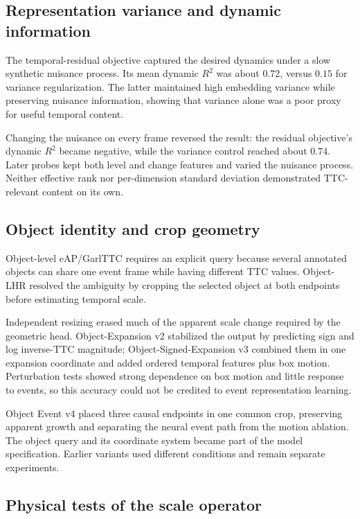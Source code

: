 \subsection{Representation variance and dynamic information}

The temporal-residual objective captured the desired dynamics under a slow synthetic nuisance process. Its mean dynamic $R^2$ was about $0.72$, versus $0.15$ for variance regularization. The latter maintained high embedding variance while preserving nuisance information, showing that variance alone was a poor proxy for useful temporal content. 

Changing the nuisance on every frame reversed the result: the residual objective's dynamic $R^2$ became negative, while the variance control reached about $0.74$. Later probes kept both level and change features and varied the nuisance process. Neither effective rank nor per-dimension standard deviation demonstrated TTC-relevant content on its own. 

\subsection{Object identity and crop geometry}

Object-level eAP/GarlTTC requires an explicit query because several annotated objects can share one event frame while having different TTC values. Object-LHR resolved the ambiguity by cropping the selected object at both endpoints before estimating temporal scale.

Independent resizing erased much of the apparent scale change required by the geometric head. Object-Expansion v2 stabilized the output by predicting sign and log inverse-TTC magnitude; Object-Signed-Expansion v3 combined them in one expansion coordinate and added ordered temporal features plus box motion. Perturbation tests showed strong dependence on box motion and little response to events, so this accuracy could not be credited to event representation learning.

Object Event v4 placed three causal endpoints in one common crop, preserving apparent growth and separating the neural event path from the motion ablation. The object query and its coordinate system became part of the model specification. Earlier variants used different conditions and remain separate experiments.

\subsection{Physical tests of the scale operator}

